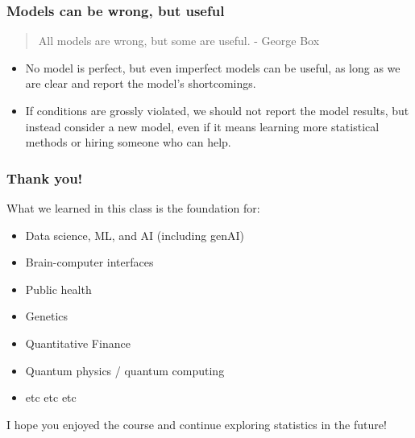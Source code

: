 \documentclass[slidestop,compress,mathserif]{beamer}
\begin{document}

\begin{frame}
\frametitle{Models can be wrong, but useful}

\begin{quote}
All models are wrong, but some are useful. - George Box
\end{quote}

\begin{itemize}

\item No model is perfect, but even imperfect models can be useful, as long as we are clear and report the model's shortcomings.

\item If conditions are grossly violated, we should not report the model results, but instead consider a new model, even if it means learning more statistical methods or hiring someone who can help.

\end{itemize}

\end{frame}


\begin{frame}
    \frametitle{Thank you!}

    What we learned in this class is the foundation for:
    \begin{itemize}
        \item Data science, ML, and AI (including genAI)
        \item Brain-computer interfaces
        \item Public health
        \item Genetics
        \item Quantitative Finance
        \item Quantum physics / quantum computing
        \item etc etc etc
    \end{itemize}

    I hope you enjoyed the course and continue exploring statistics in the future!

\end{frame}

\end{document}
